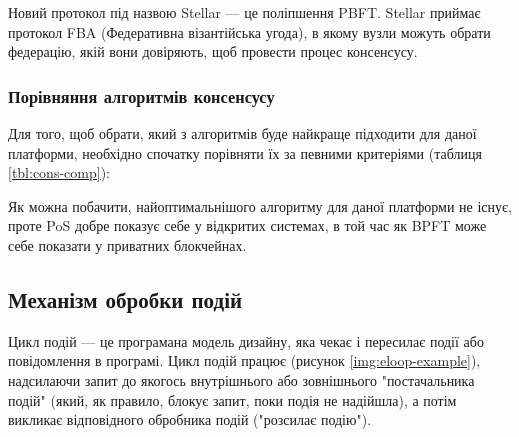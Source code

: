 \documentclass{lib/styles/default-style}
\begin{document}
    Новий протокол під назвою Stellar --- це поліпшення PBFT.
    Stellar приймає протокол FBA (Федеративна візантійська угода), в якому вузли можуть обрати федерацію,
    якій вони довіряють, щоб провести процес консенсусу.

    \subsubsection{Порівняння алгоритмів консенсусу}

    Для того, щоб обрати, який з алгоритмів буде найкраще підходити для
    даної платформи, необхідно спочатку порівняти їх за певними критеріями (таблиця \ref{tbl:cons-comp}):

    
    Як можна побачити, найоптимальнішого алгоритму для даної платформи не існує, проте PoS добре показує себе у відкритих системах,
    в той час як BPFT може себе показати у приватних блокчейнах.

\subsection{Механізм обробки подій}

    Цикл подій --- це програмана модель дизайну, яка чекає і пересилає події або повідомлення в програмі.
    Цикл подій працює (рисунок \ref{img:eloop-example}), надсилаючи запит до якогось внутрішнього або зовнішнього "постачальника подій"
    (який, як правило, блокує запит, поки подія не надійшла), а потім викликає відповідного обробника подій ("розсилає подію").

\end{document}
